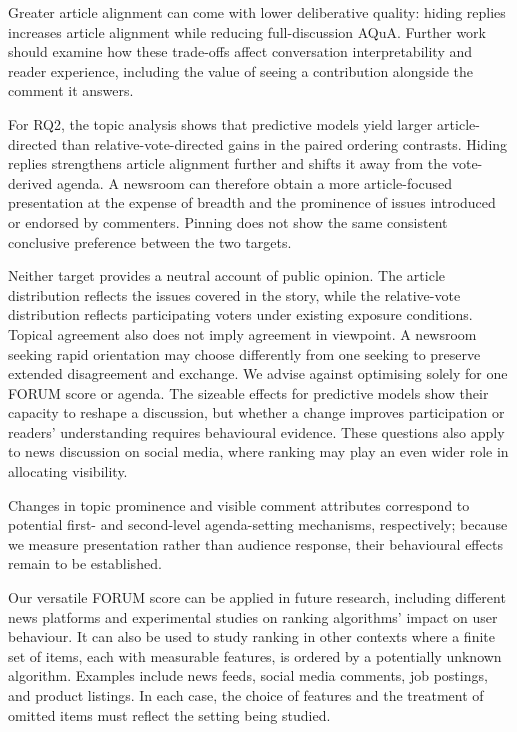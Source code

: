 Greater article alignment can come with lower deliberative quality: hiding replies increases article alignment while reducing full-discussion AQuA. Further work should examine how these trade-offs affect conversation interpretability and reader experience, including the value of seeing a contribution alongside the comment it answers.

For RQ2, the topic analysis shows that predictive models yield larger article-directed than relative-vote-directed gains in the paired ordering contrasts. Hiding replies strengthens article alignment further and shifts it away from the vote-derived agenda. A newsroom can therefore obtain a more article-focused presentation at the expense of breadth and the prominence of issues introduced or endorsed by commenters. Pinning does not show the same consistent conclusive preference between the two targets.

Neither target provides a neutral account of public opinion. The article distribution reflects the issues covered in the story, while the relative-vote distribution reflects participating voters under existing exposure conditions. Topical agreement also does not imply agreement in viewpoint. A newsroom seeking rapid orientation may choose differently from one seeking to preserve extended disagreement and exchange. We advise against optimising solely for one FORUM score or agenda. The sizeable effects for predictive models show their capacity to reshape a discussion, but whether a change improves participation or readers' understanding requires behavioural evidence. These questions also apply to news discussion on social media, where ranking may play an even wider role in allocating visibility.

Changes in topic prominence and visible comment attributes correspond to potential first- and second-level agenda-setting mechanisms, respectively; because we measure presentation rather than audience response, their behavioural effects remain to be established.

Our versatile FORUM score can be applied in future research, including different news platforms and experimental studies on ranking algorithms' impact on user behaviour. It can also be used to study ranking in other contexts where a finite set of items, each with measurable features, is ordered by a potentially unknown algorithm. Examples include news feeds, social media comments, job postings, and product listings. In each case, the choice of features and the treatment of omitted items must reflect the setting being studied.

